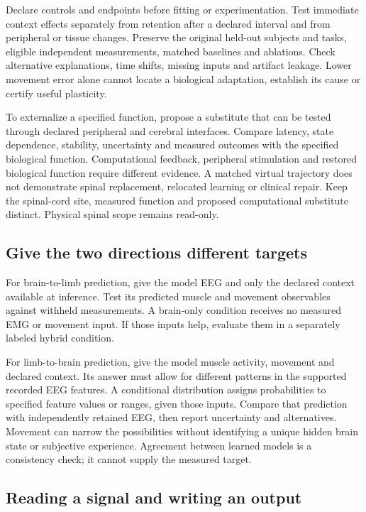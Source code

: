 Declare controls and endpoints before fitting or experimentation. Test
immediate context effects separately from retention after a declared interval
and from peripheral or tissue changes. Preserve the original held-out subjects
and tasks, eligible independent measurements, matched baselines and ablations.
Check alternative explanations, time shifts, missing inputs and artifact
leakage. Lower movement error alone cannot locate a biological adaptation,
establish its cause or certify useful plasticity.

To externalize a specified function, propose a substitute that can be tested
through declared peripheral and cerebral interfaces. Compare latency, state
dependence, stability, uncertainty and measured outcomes with the specified
biological function. Computational feedback, peripheral stimulation and restored
biological function require different evidence. A matched virtual trajectory
does not demonstrate spinal replacement, relocated learning or clinical repair.
Keep the spinal-cord site, measured function and proposed computational
substitute distinct. Physical spinal scope remains read-only.

\subsection{Give the two directions different targets}

For brain-to-limb prediction, give the model EEG and only the declared context
available at inference. Test its predicted muscle and movement observables
against withheld measurements. A brain-only condition receives no measured EMG
or movement input. If those inputs help, evaluate them in a separately labeled
hybrid condition.

For limb-to-brain prediction, give the model muscle activity, movement and
declared context. Its answer must allow for different patterns in the supported
recorded EEG features. A conditional distribution assigns probabilities to
specified feature values or ranges, given those inputs. Compare that prediction
with independently retained EEG, then report uncertainty and alternatives.
Movement can narrow the possibilities without identifying a unique hidden
brain state or subjective experience. Agreement between learned models is a
consistency check; it cannot supply the measured target.

\subsection{Reading a signal and writing an output}

